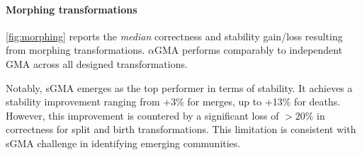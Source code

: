 \documentclass[letterpaper]{article}
\begin{document}
\paragraph*{Morphing transformations} 

\cref{fig:morphing} reports the \emph{median} correctness and stability gain/loss resulting from morphing transformations. $\alpha$GMA performs comparably to independent GMA across all designed transformations.

Notably, sGMA emerges as the top performer in terms of stability. It achieves a stability improvement ranging from +3\% for merges, up to +13\% for deaths. However, this improvement is countered by a significant loss of $>20\%$ in correctness for split and birth transformations. This limitation is consistent with sGMA challenge in identifying emerging communities.
\end{document}
